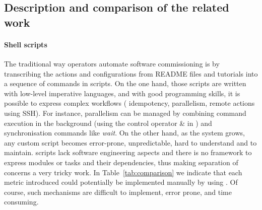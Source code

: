 \subsection{Description and comparison of the related work}

\paragraph{Shell scripts}
The traditional way operators automate software commissioning is by
transcribing the actions and configurations from README files and tutorials
into a sequence of commands in \shell scripts. On the one hand, those
scripts are written with low-level imperative languages, and with good
programming skills, it is possible to express complex workflows (\eg
idempotency, parallelism, remote actions using SSH). For
instance, parallelism can be managed by combining command execution in
the background (\eg using the control operator \& in \bash) and
synchronisation commands like \emph{wait}. On the other hand, as the
system grows, any custom script becomes error-prone, unpredictable,
hard to understand and to maintain. \shell scripts lack software
engineering aspects and there is no framework to express modules or
tasks and their dependencies, thus making separation of concerns a very
tricky work. In Table~\ref{tab:comparison} we indicate that each
metric introduced could potentially be implemented manually by using
\shell. Of course, such mechanisms are difficult to implement, error
prone, and time consuming.

